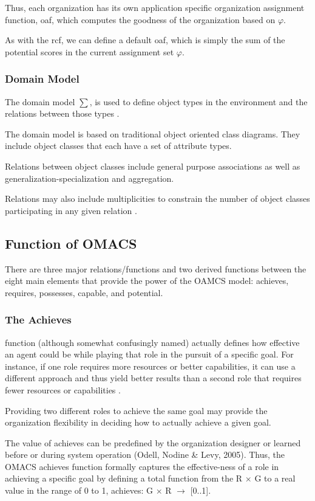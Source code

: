 Thus, each organization has its own application specific organization assignment function, oaf, which computes the goodness of the organization based on $\varphi$. 
	
As with the rcf, we can define a default oaf, which is simply the sum of the potential scores in the current assignment set $\varphi$.
 
 
\subsubsection{Domain Model} 

The domain model $\sum$, is used to define object types in the environment 
and the relations between those types \cite{omacs2}.

The domain model is based on traditional object oriented class diagrams. They
include object classes that each have a set of attribute types. 

Relations between object classes include general purpose associations
 as well as generalization-specialization and aggregation.
 
Relations may also include multiplicities to constrain the number of object classes participating in
any given relation \cite{omacs2}.
 
\subsection{Function of OMACS}

There are three major relations/functions and two derived functions between the eight main elements that provide the power of the OAMCS model: achieves, requires, possesses, capable, and potential. 
\subsubsection{The Achieves}
function (although somewhat confusingly named) actually defines how effective an agent could be while playing that role in the pursuit of a specific goal. For instance, if one role requires more resources or better capabilities, it can use a different approach and thus yield better results than a second role that requires fewer resources or capabilities \cite{omacs4}.

Providing two different roles to achieve the same goal may provide the organization flexibility in deciding how to actually achieve a given goal.

The value of achieves can be predefined by the organization designer or learned before or during system operation (Odell, Nodine \& Levy, 2005). Thus, the OMACS achieves function formally captures the effective-ness of a role in achieving a specific goal by defining a total function from the R $\times$ G to a real value in the range of 0 to 1, achieves: G $\times$ R $\rightarrow$ {[}0..1{]}.
 
